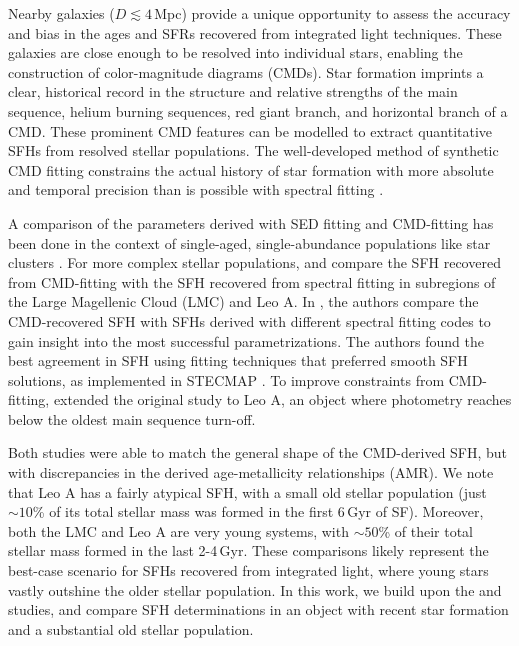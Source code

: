 \documentclass[preprint2]{aastex62}
\newcommand{\Gyr}{$\,$Gyr\xspace}
\begin{document}
Nearby galaxies ($D\lesssim4$\,Mpc) provide a unique opportunity to assess the accuracy and bias in the ages and SFRs recovered from integrated light techniques. These galaxies are close enough to be resolved into individual stars, enabling the construction of color-magnitude diagrams (CMDs). Star formation imprints a clear, historical record in the structure and relative strengths of the main sequence, helium burning sequences, red giant branch, and horizontal branch of a CMD. These prominent CMD features can be modelled to extract quantitative SFHs from resolved stellar populations. The well-developed method of synthetic CMD fitting constrains the actual history of star formation with more absolute and temporal precision than is possible with spectral fitting \citep[see \citet{Tolstoy+2009} and references therein; also ][]{Weisz+2011}.

A comparison of the parameters derived with SED fitting and CMD-fitting has been done in the context of single-aged, single-abundance populations like star clusters \citep[e.g., ][]{Gibson+1999, Beasley+2002, Delgado+2010, Thomas+2011, Barber+2014, Kuncarayakti+2016, Usher+2017}. For more complex stellar populations, \citet{Ruiz-Lara+2015} and \citet{Ruiz-Lara+2018} compare the SFH recovered from CMD-fitting with the SFH recovered from spectral fitting in subregions of the Large Magellenic Cloud (LMC) and Leo A. In \citet{Ruiz-Lara+2015}, the authors compare the CMD-recovered SFH with SFHs derived with different spectral fitting codes to gain insight into the most successful parametrizations. The authors found the best agreement in SFH using fitting techniques that preferred smooth SFH solutions, as implemented in STECMAP \citep{Ocvirk+2006}. To improve constraints from CMD-fitting, \citet{Ruiz-Lara+2018} extended the original study to Leo A, an object where photometry reaches below the oldest main sequence turn-off.

Both studies were able to match the general shape of the CMD-derived SFH, but with discrepancies in the derived age-metallicity relationships (AMR). We note that Leo A has a fairly atypical SFH, with a small old stellar population (just $\sim10$\% of its total stellar mass was formed in the first 6\Gyr of SF). Moreover, both the LMC and Leo A are very young systems, with $\sim50$\% of their total stellar mass formed in the last 2-4\Gyr. These comparisons likely represent the best-case scenario for SFHs recovered from integrated light, where young stars vastly outshine the older stellar population. In this work, we build upon the \citet{Ruiz-Lara+2015} and \citet{Ruiz-Lara+2018} studies, and compare SFH determinations in an object with recent star formation and a substantial old stellar population. 
\end{document}
